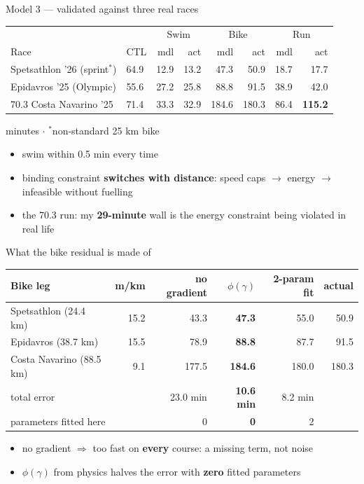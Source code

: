 \documentclass[10pt,aspectratio=169]{beamer}
\newcommand{\speakernote}[1]{}
\begin{document}
\begin{frame}{Model 3 --- validated against three real races}
\begin{center}\small
\begin{tabular}{llrrrrrr}
\toprule
& & \multicolumn{2}{c}{Swim} & \multicolumn{2}{c}{Bike} & \multicolumn{2}{c}{Run}\\
Race & CTL & mdl & act & mdl & act & mdl & act\\
\midrule
Spetsathlon '26 (sprint$^\ast$) & 64.9 & 12.9 & 13.2 & 47.3 & 50.9 & 18.7 & 17.7\\
Epidavros '25 (Olympic) & 55.6 & 27.2 & 25.8 & 88.8 & 91.5 & 38.9 & 42.0\\
70.3 Costa Navarino '25 & 71.4 & 33.3 & 32.9 & 184.6 & 180.3 & 86.4 & \textbf{115.2}\\
\bottomrule
\end{tabular}

{\scriptsize minutes $\cdot$ $^\ast$non-standard 25 km bike}
\end{center}
\vspace{4pt}
\begin{itemize}\itemsep5pt
  \item swim within 0.5 min every time
  \item binding constraint \textbf{switches with distance}: speed caps $\to$ energy
        $\to$ infeasible without fuelling
  \item the 70.3 run: my \textbf{29-minute} wall is the energy constraint being violated in real life
\end{itemize}
\end{frame}

\speakernote{m3_validation}

\begin{frame}{What the bike residual is made of}
\begin{center}\small
\begin{tabular}{lrrrrr}
\toprule
Bike leg & m/km & no gradient & $\phi(\gamma)$ & 2-param fit & actual\\
\midrule
Spetsathlon (24.4 km) & 15.2 & 43.3 & \textbf{47.3} & 55.0 & 50.9\\
Epidavros (38.7 km) & 15.5 & 78.9 & \textbf{88.8} & 87.7 & 91.5\\
Costa Navarino (88.5 km) & 9.1 & 177.5 & \textbf{184.6} & 180.0 & 180.3\\
\midrule
\multicolumn{2}{l}{total error} & 23.0 min & \textbf{10.6 min} & 8.2 min & \\
\multicolumn{2}{l}{parameters fitted here} & 0 & \textbf{0} & 2 & \\
\bottomrule
\end{tabular}
\end{center}
\vspace{6pt}
\begin{itemize}\itemsep5pt
  \item no gradient $\Rightarrow$ too fast on \textbf{every} course: a missing term, not noise
  \item $\phi(\gamma)$ from physics halves the error with \textbf{zero} fitted parameters
\end{itemize}
\end{frame}
\end{document}
